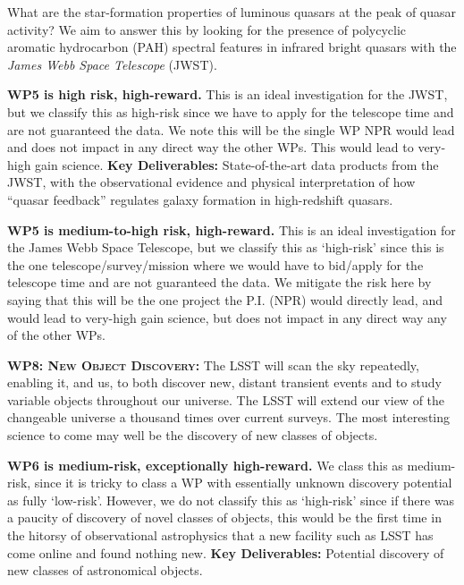 \smallskip
\smallskip
\noindent
What are the star-formation properties of luminous quasars at the peak
of quasar activity?  We aim to answer this by looking for the presence
of polycyclic aromatic hydrocarbon (PAH) spectral features in infrared
bright quasars with the {\it James Webb Space Telescope} (JWST).  

\smallskip
\smallskip
\noindent
{\bf WP5 is high risk, high-reward.}  This is an ideal investigation for
the JWST, but we classify this as high-risk since we have to apply for
the telescope time and are not guaranteed the data.  We note this will
be the single WP NPR would lead and does not impact in any direct way
the other WPs. This would lead to very-high gain science.  {\bf Key
Deliverables:} State-of-the-art data products from the JWST, with the
observational evidence and physical interpretation of how ``quasar
feedback'' regulates galaxy formation in high-redshift quasars.

\smallskip
\smallskip
\noindent
{\bf WP5 is medium-to-high risk, high-reward.}
This is an ideal investigation for the James Webb Space Telescope, but we classify this as `high-risk' since this is the one telescope/survey/mission where we would have to bid/apply for the telescope time and are not guaranteed the data. We mitigate the risk here by saying that this will be the one project the P.I. (NPR) would directly lead, and would lead to very-high gain science, but does not impact in any direct way any of the other WPs. 



\smallskip
\smallskip
\noindent
\textbf{\textsc{WP8: New Object Discovery:}} 
The LSST will scan the sky repeatedly, enabling it, and us, to both
discover new, distant transient events and to study variable objects
throughout our universe. The LSST will extend our view of the
changeable universe a thousand times over current surveys.  The most
interesting science to come may well be the discovery of new classes
of objects.

\smallskip
\smallskip
\noindent
{\bf WP6 is medium-risk, exceptionally high-reward.}
We class this as medium-risk, since it is tricky to class a WP with essentially unknown discovery potential as fully `low-risk'. However, we do not classify this as `high-risk' since if there was a paucity of discovery of novel classes of objects, this would be the first time in the hitorsy of observational astrophysics that a new facility such as LSST has come online and found nothing new. 
{\bf Key Deliverables:} Potential discovery of new classes of astronomical objects. 



